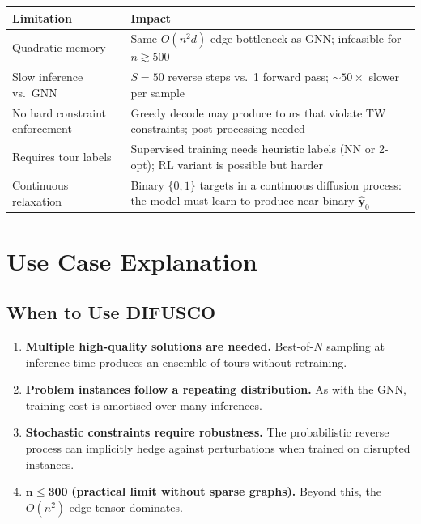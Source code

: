 \documentclass[12pt,a4paper]{article}
\begin{document}
\begin{center}
\begin{tabular}{lp{9.5cm}}
\toprule
\textbf{Limitation} & \textbf{Impact} \\
\midrule
Quadratic memory & Same $O(n^2 d)$ edge bottleneck as GNN; infeasible for
  $n \gtrsim 500$ \\
Slow inference vs.\ GNN & $S = 50$ reverse steps vs.\ 1 forward pass;
  ${\sim}50\times$ slower per sample \\
No hard constraint enforcement & Greedy decode may produce tours that violate
  TW constraints; post-processing needed \\
Requires tour labels & Supervised training needs heuristic labels
  (NN or 2-opt); RL variant is possible but harder \\
Continuous relaxation & Binary $\{0,1\}$ targets in a continuous diffusion
  process: the model must learn to produce near-binary $\hat{\mathbf{y}}_0$ \\
\bottomrule
\end{tabular}
\end{center}

\section{Use Case Explanation}

\subsection*{When to Use DIFUSCO}

\begin{enumerate}[leftmargin=2em]
  \item \textbf{Multiple high-quality solutions are needed.}
    Best-of-$N$ sampling at inference time produces an ensemble of tours
    without retraining.

  \item \textbf{Problem instances follow a repeating distribution.}
    As with the GNN, training cost is amortised over many inferences.

  \item \textbf{Stochastic constraints require robustness.}
    The probabilistic reverse process can implicitly hedge against perturbations
    when trained on disrupted instances.

  \item $\boldsymbol{n \leq 300}$ \textbf{(practical limit without sparse graphs).}
    Beyond this, the $O(n^2)$ edge tensor dominates.
\end{enumerate}
\end{document}
